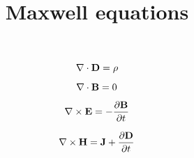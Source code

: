 \documentclass{article}
\begin{document}
\title{Maxwell equations}
\maketitle

\begin{equation}
\nabla\cdot{\bf D} = \rho 
\end{equation}

\begin{equation}
\nabla\cdot{\bf B} = 0 
\end{equation}

\begin{equation}
\nabla\times{\bf E} = - {{\partial{\bf B}}\over{\partial t}} 
\end{equation}

\begin{equation}
\nabla\times{\bf H} = {\bf J} + {{\partial{\bf D}}\over{\partial t}} 
\end{equation}
\end{document}

